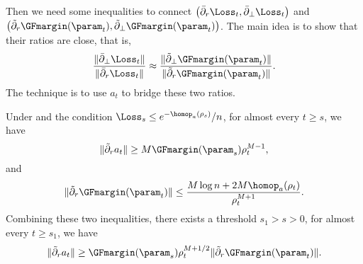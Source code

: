 Then we need some inequalities to connect $\big( \bar \partial_r \Loss_t, \bar \partial_\perp \Loss_t \big)$ and $\big( \tilde \partial_r\GFmargin(\param_t), \tilde \partial_\perp \GFmargin(\param_t) \big)$.  The main idea is to show that their ratios are close, that is, 
\[
    \frac{\| \bar \partial_\perp \Loss_t\|}{\| \bar \partial_r \Loss_t\|} \approx \frac{\| \tilde \partial_\perp \GFmargin(\param_t)\|}{\| \tilde \partial_r \GFmargin(\param_t)\|}.
\] 
The technique is to use $a_t$ to bridge these two ratios.   


\begin{lemma}
\label{lem: Inequalities between a and gamma}
Under  and the condition $\Loss_s \le e^{-\homop_a(\rho_s)}/n$, for almost every $t\ge s$, we have 
\begin{equation}
\label{eq: lowerbound partial_r a}
    \| \tilde \partial_r a_t\| \ge M \GFmargin(\param_s) \rho_t^{M-1}, 
\end{equation}
and 
\begin{equation}
\label{eq: upperbound partial_r gamma^c}
    \| \tilde \partial_r \GFmargin(\param_t)\| \le \frac{M \log n + 2M \homop_a(\rho_t)}{\rho_t^{M+1}}. 
\end{equation}
Combining these two inequalities, there exists a threshold $s_1>s>0$, for almost every $t \ge s_1$,  we have 
\begin{equation}
\label{eq: partial_r a large partial_r gamma^c}
    \| \tilde \partial_r a_t\| \ge  \GFmargin(\param_s) \rho_t^{M+1 /2}  \| \tilde \partial_r \GFmargin(\param_t)\|.
\end{equation}

\end{lemma}
